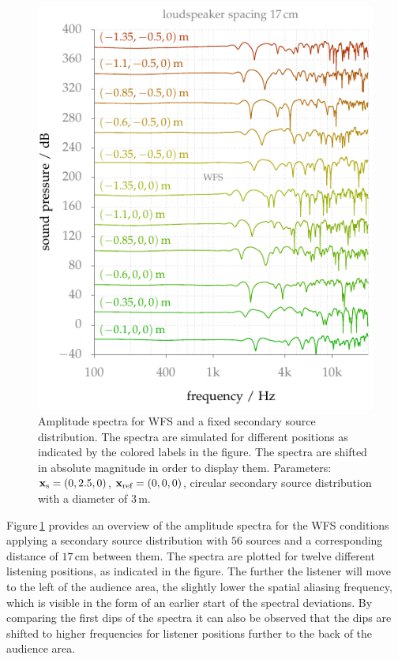 \begin{figure}
    \centering
    \includegraphics{fig5_09/fig5_09}
    \caption{Amplitude spectra for \ac{WFS} and a fixed secondary source
    distribution. The spectra are simulated for different positions as
    indicated by the colored labels in the figure.
    The spectra are shifted in absolute magnitude in order to display
    them.
    Parameters: $\mathbf{x}_\text{s} = (0,2.5,0)$, $\mathbf{x}_\text{ref} = (0,0,0)$, circular secondary source
    distribution with a diameter of $3$\,m.
    }
    \label{fig:coloration_freq_response_moving}
\end{figure}
%
Figure\,\ref{fig:coloration_freq_response_moving} provides an overview of the amplitude
spectra for the \ac{WFS} conditions applying a secondary source distribution
with $56$ sources and a corresponding distance of $17$\,cm between them. The
spectra are plotted for twelve different listening positions, as indicated in
the figure. The further the listener will move to the left of the audience area,
the slightly lower the spatial aliasing frequency, which is visible in the form
of an earlier start of the spectral deviations. By comparing the
first dips of the spectra it can also be observed that the dips are shifted to
higher frequencies for listener positions further to the back of the audience
area.


